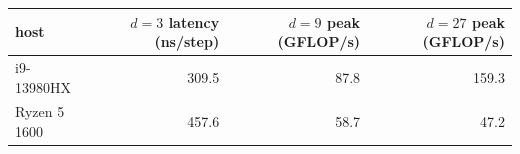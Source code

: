 \begin{tabular}{@{}lrrr@{}}
\toprule
host & $d=3$ latency (ns/step) & $d=9$ peak (GFLOP/s) & $d=27$ peak (GFLOP/s) \\
\midrule
i9-13980HX & 309.5 & 87.8 & 159.3 \\
Ryzen 5 1600 & 457.6 & 58.7 & 47.2 \\
\bottomrule
\end{tabular}
